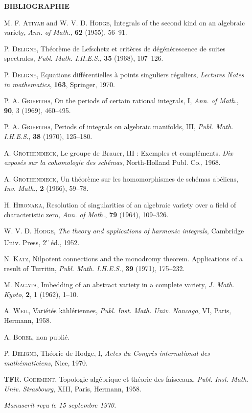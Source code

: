 \documentclass[10pt]{article}
\begin{document}
\begin{center}
\bfseries BIBLIOGRAPHIE
\end{center}

\begin{enumerate}[label={[\arabic*]},leftmargin=2.8em]
\item \textsc{M. F. Atiyah} and \textsc{W. V. D. Hodge}, Integrals of the second kind on an algebraic variety, \emph{Ann. of Math.}, \textbf{62} (1955), 56--91.
\item \textsc{P. Deligne}, Théorème de Lefschetz et critères de dégénérescence de suites spectrales, \emph{Publ. Math. I.H.E.S.}, \textbf{35} (1968), 107--126.
\item \textsc{P. Deligne}, Equations différentielles à points singuliers réguliers, \emph{Lectures Notes in mathematics}, \textbf{163}, Springer, 1970.
\item \textsc{P. A. Griffiths}, On the periods of certain rational integrals, I, \emph{Ann. of Math.}, \textbf{90}, 3 (1969), 460--495.
\item \textsc{P. A. Griffiths}, Periods of integrals on algebraic manifolds, III, \emph{Publ. Math. I.H.E.S.}, \textbf{38} (1970), 125--180.
\item \textsc{A. Grothendieck}, Le groupe de Brauer, III : Exemples et compléments. \emph{Dix exposés sur la cohomologie des schémas}, North-Holland Publ. Co., 1968.
\item \textsc{A. Grothendieck}, Un théorème sur les homomorphismes de schémas abéliens, \emph{Inv. Math.}, \textbf{2} (1966), 59--78.
\item \textsc{H. Hironaka}, Resolution of singularities of an algebraic variety over a field of characteristic zero, \emph{Ann. of Math.}, \textbf{79} (1964), 109--326.
\item \textsc{W. V. D. Hodge}, \emph{The theory and applications of harmonic integrals}, Cambridge Univ. Press, 2\textsuperscript{e} éd., 1952.
\item \textsc{N. Katz}, Nilpotent connections and the monodromy theorem. Applications of a result of Turritin, \emph{Publ. Math. I.H.E.S.}, \textbf{39} (1971), 175--232.
\item \textsc{M. Nagata}, Imbedding of an abstract variety in a complete variety, \emph{J. Math. Kyoto}, \textbf{2}, 1 (1962), 1--10.
\item \textsc{A. Weil}, Variétés kählériennes, \emph{Publ. Inst. Math. Univ. Nancago}, VI, Paris, Hermann, 1958.
\item \textsc{A. Borel}, non publié.
\item \textsc{P. Deligne}, Théorie de Hodge, I, \emph{Actes du Congrès international des mathématiciens}, Nice, 1970.
\end{enumerate}

\noindent\textbf{TF}\quad \textsc{R. Godement}, Topologie algébrique et théorie des faisceaux, \emph{Publ. Inst. Math. Univ. Strasbourg}, XIII, Paris, Hermann, 1958.

\begin{center}
\emph{Manuscrit reçu le 15 septembre 1970.}
\end{center}

\end{document}
